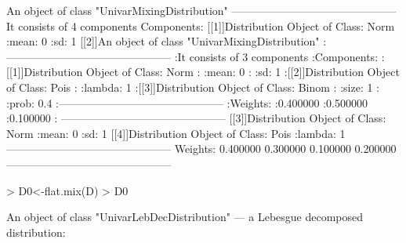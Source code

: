 \documentclass[11pt]{article}
\newcommand{\code}[1]{{\tt #1}}
\begin{document}
\begin{Schunk}
\begin{Soutput}
An object of class "UnivarMixingDistribution"
 ---------------------------------------------
 It consists of  4 components
 Components:
 [[1]]Distribution Object of Class: Norm
       :mean: 0
       :sd: 1
 [[2]]An object of class "UnivarMixingDistribution"
       :---------------------------------------------
       :It consists of  3 components
       :Components:
       :[[1]]Distribution Object of Class: Norm
       :      :mean: 0
       :      :sd: 1
       :[[2]]Distribution Object of Class: Pois
       :      :lambda: 1
       :[[3]]Distribution Object of Class: Binom
       :      :size: 1
       :      :prob: 0.4
       :---------------------------------------------
       :Weights:
       :0.400000       :0.500000       :0.100000       :
 ---------------------------------------------
 [[3]]Distribution Object of Class: Norm
       :mean: 0
       :sd: 1
 [[4]]Distribution Object of Class: Pois
       :lambda: 1
 ---------------------------------------------
 Weights:
 0.400000 0.300000 0.100000 0.200000
 ---------------------------------------------
\end{Soutput}
\begin{Sinput}
> D0<-flat.mix(D)
> D0
\end{Sinput}
\begin{Soutput}
An object of class "UnivarLebDecDistribution"
 --- a Lebesgue decomposed distribution:


\end{Soutput}
\end{Schunk}
\end{document}
\end{Sinput}
\end{Schunk}
\end{document}
